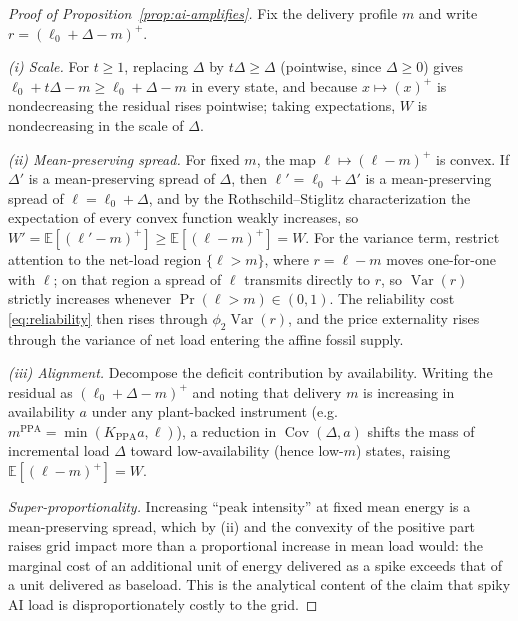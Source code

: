 \documentclass[a4paper,fleqn,longmktitle]{cas-sc}
\theoremstyle{plain}
\theoremstyle{definition}
\newcommand{\E}{\mathbb{E}}
\newcommand{\Var}{\operatorname{Var}}
\newcommand{\Cov}{\operatorname{Cov}}
\newcommand{\pos}[1]{\left(#1\right)^{+}}
\newcommand{\PPA}{\mathrm{PPA}}
\begin{document}
\begin{proof}[Proof of Proposition~\ref{prop:ai-amplifies}]
Fix the delivery profile $m$ and write $r=\pos{\ell_0+\Delta-m}$.

\emph{(i) Scale.} For $t\ge 1$, replacing $\Delta$ by $t\Delta\ge\Delta$ (pointwise, since $\Delta\ge 0$) gives $\ell_0+t\Delta-m\ge \ell_0+\Delta-m$ in every state, and because $x\mapsto\pos{x}$ is nondecreasing the residual rises pointwise; taking expectations, $W$ is nondecreasing in the scale of $\Delta$.

\emph{(ii) Mean-preserving spread.} For fixed $m$, the map $\ell\mapsto\pos{\ell-m}$ is convex. If $\Delta'$ is a mean-preserving spread of $\Delta$, then $\ell'=\ell_0+\Delta'$ is a mean-preserving spread of $\ell=\ell_0+\Delta$, and by the Rothschild--Stiglitz characterization the expectation of every convex function weakly increases, so $W'=\E[\pos{\ell'-m}]\ge \E[\pos{\ell-m}]=W$. For the variance term, restrict attention to the net-load region $\{\ell>m\}$, where $r=\ell-m$ moves one-for-one with $\ell$; on that region a spread of $\ell$ transmits directly to $r$, so $\Var(r)$ strictly increases whenever $\Pr(\ell>m)\in(0,1)$. The reliability cost \eqref{eq:reliability} then rises through $\phi_2\Var(r)$, and the price externality rises through the variance of net load entering the affine fossil supply.

\emph{(iii) Alignment.} Decompose the deficit contribution by availability. Writing the residual as $\pos{\ell_0+\Delta-m}$ and noting that delivery $m$ is increasing in availability $a$ under any plant-backed instrument (e.g.\ $m^{\PPA}=\min(K_{\PPA}a,\ell)$), a reduction in $\Cov(\Delta,a)$ shifts the mass of incremental load $\Delta$ toward low-availability (hence low-$m$) states, raising $\E[\pos{\ell-m}]=W$.

\emph{Super-proportionality.} Increasing ``peak intensity'' at fixed mean energy is a mean-preserving spread, which by (ii) and the convexity of the positive part raises grid impact more than a proportional increase in mean load would: the marginal cost of an additional unit of energy delivered as a spike exceeds that of a unit delivered as baseload. This is the analytical content of the claim that spiky AI load is disproportionately costly to the grid.
\end{proof}
\end{document}
